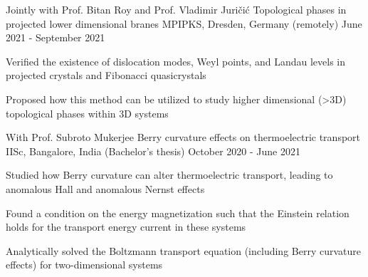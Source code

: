 \begin{cventries}
\cventry
{Jointly with Prof. Bitan Roy and Prof. Vladimir Juri\v{c}i\'c} %
{Topological phases in projected lower dimensional branes} %
{MPIPKS, Dresden, Germany (remotely)} %
{June 2021 - September 2021} %
{
	\begin{cvitems} %
		\item {Verified the existence of dislocation modes, Weyl points, and Landau levels in projected crystals and Fibonacci quasicrystals}
		\item {Proposed how this method can be utilized to study higher dimensional (>3D) topological phases within 3D systems}
	\end{cvitems}
}

\cventry
{With Prof. Subroto Mukerjee} %
{Berry curvature effects on thermoelectric transport} %
{IISc, Bangalore, India \space \space\space\space\space\space\space\space\space\space\space(Bachelor's thesis)} %
{October 2020 - June 2021} %
{
	\begin{cvitems} %
		\item {Studied how Berry curvature can alter thermoelectric transport, leading to anomalous Hall and anomalous Nernst effects}
		\item {Found a condition on the energy magnetization such that the Einstein relation holds for the transport energy current in these systems}
		\item {Analytically solved the Boltzmann transport equation (including Berry curvature effects) for two-dimensional systems}
	\end{cvitems}
}
	

\end{cventries}
